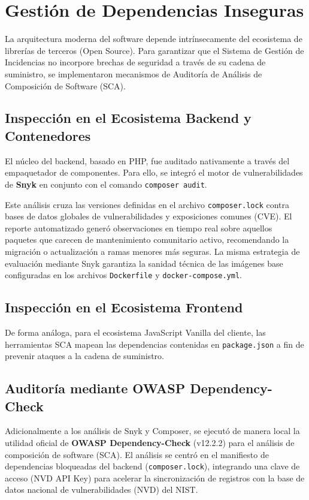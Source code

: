 \section{Gestión de Dependencias Inseguras}

La arquitectura moderna del software depende intrínsecamente del ecosistema de librerías de terceros (Open Source). Para garantizar que el Sistema de Gestión de Incidencias no incorpore brechas de seguridad a través de su cadena de suministro, se implementaron mecanismos de Auditoría de Análisis de Composición de Software (SCA).

\subsection{Inspección en el Ecosistema Backend y Contenedores}

El núcleo del backend, basado en PHP, fue auditado nativamente a través del empaquetador de componentes. Para ello, se integró el motor de vulnerabilidades de \textbf{Snyk} en conjunto con el comando \texttt{composer audit}. 

Este análisis cruza las versiones definidas en el archivo \texttt{composer.lock} contra bases de datos globales de vulnerabilidades y exposiciones comunes (CVE). El reporte automatizado generó observaciones en tiempo real sobre aquellos paquetes que carecen de mantenimiento comunitario activo, recomendando la migración o actualización a ramas menores más seguras. La misma estrategia de evaluación mediante Snyk garantiza la sanidad técnica de las imágenes base configuradas en los archivos \texttt{Dockerfile} y \texttt{docker-compose.yml}.

\subsection{Inspección en el Ecosistema Frontend}

De forma análoga, para el ecosistema JavaScript Vanilla del cliente, las herramientas SCA mapean las dependencias contenidas en \texttt{package.json} a fin de prevenir ataques a la cadena de suministro.

\subsection{Auditoría mediante OWASP Dependency-Check}

Adicionalmente a los análisis de Snyk y Composer, se ejecutó de manera local la utilidad oficial de \textbf{OWASP Dependency-Check} (v12.2.2) para el análisis de composición de software (SCA). El análisis se centró en el manifiesto de dependencias bloqueadas del backend (\texttt{composer.lock}), integrando una clave de acceso (NVD API Key) para acelerar la sincronización de registros con la base de datos nacional de vulnerabilidades (NVD) del NIST.

